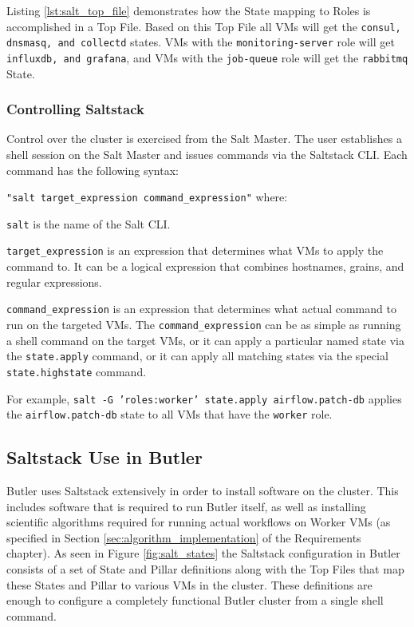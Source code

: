 Listing \ref{lst:salt_top_file} demonstrates how the State mapping to Roles is accomplished in a Top File. Based on this Top File all VMs will get the \texttt{consul, dnsmasq, and collectd} states. VMs with the \texttt{monitoring-server} role will get \texttt{influxdb, and grafana}, and VMs with the \texttt{job-queue} role will get the \texttt{rabbitmq} State.

\subsubsection{Controlling Saltstack}

Control over the cluster is exercised from the Salt Master. The user establishes a shell session on the Salt Master and issues commands via the Saltstack CLI. Each command has the following syntax:

\texttt{"salt target_expression command_expression"} where:

\texttt{salt} is the name of the Salt CLI.

\texttt{target_expression} is an expression that determines what VMs to apply the command to. It can be a logical expression that combines hostnames, grains, and regular expressions.

\texttt{command_expression} is an expression that determines what actual command to run on the targeted VMs. The \texttt{command_expression} can be as simple as running a shell command on the target VMs, or it can apply a particular named state via the \texttt{state.apply} command, or it can apply all matching states via the special \texttt{state.highstate} command.

For example, \texttt{salt -G 'roles:worker' state.apply airflow.patch-db} applies the \texttt{airflow.patch-db} state to all VMs that have the \texttt{worker} role.

\subsection{Saltstack Use in Butler}

Butler uses Saltstack extensively in order to install software on the cluster. This includes software that is required to run Butler itself, as well as installing scientific algorithms required for running actual workflows on Worker VMs (as specified in Section \ref{sec:algorithm_implementation} of the Requirements chapter). As seen in Figure \ref{fig:salt_states} the Saltstack configuration in Butler consists of a set of State and Pillar definitions along with the Top Files that map these States and Pillar to various VMs in the cluster. These definitions are enough to configure a completely functional Butler cluster from a single shell command.

